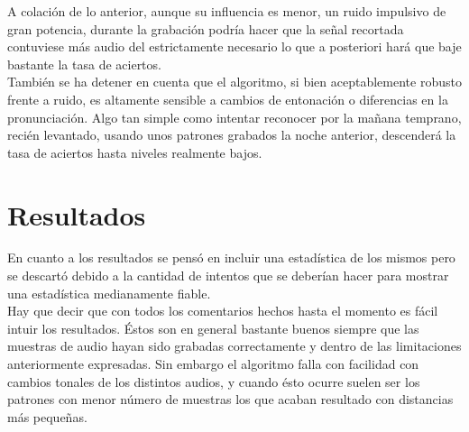 \documentclass[10pt, a4paper]{article}
\begin{document}
A colación de lo anterior, aunque su influencia es menor, un ruido impulsivo de gran potencia, durante la grabación podría hacer que la señal recortada contuviese más audio del estrictamente necesario lo que a posteriori hará que baje bastante la tasa de aciertos.\\

También se ha detener en cuenta que el algoritmo, si bien aceptablemente robusto frente a ruido, es altamente sensible a cambios de entonación o diferencias en la pronunciación. Algo tan simple como intentar reconocer por la mañana temprano, recién levantado, usando unos patrones grabados la noche anterior, descenderá la tasa de aciertos hasta niveles realmente bajos.

\section{Resultados}

En cuanto a los resultados se pensó en incluir una estadística de los mismos pero se descartó debido a la cantidad de intentos que se deberían hacer para mostrar una estadística medianamente fiable.\\
 
Hay que decir que con todos los comentarios hechos hasta el momento es fácil intuir los resultados. Éstos son en general bastante buenos siempre que las muestras de audio hayan sido grabadas correctamente y dentro de las limitaciones anteriormente expresadas. Sin embargo el algoritmo falla con facilidad con cambios tonales de los distintos audios, y cuando ésto ocurre suelen ser los patrones con menor número de muestras los que acaban resultado con distancias más pequeñas.



\end{document}
